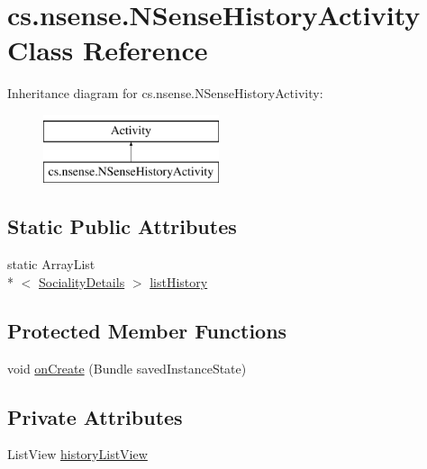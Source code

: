 \hypertarget{classcs_1_1nsense_1_1_n_sense_history_activity}{\section{cs.\-nsense.\-N\-Sense\-History\-Activity Class Reference}
\label{classcs_1_1nsense_1_1_n_sense_history_activity}
}
Inheritance diagram for cs.\-nsense.\-N\-Sense\-History\-Activity\-:\begin{figure}[H]
\begin{center}
\leavevmode
\includegraphics[height=2.000000cm]{classcs_1_1nsense_1_1_n_sense_history_activity}
\end{center}
\end{figure}
\subsection*{Static Public Attributes}
\begin{DoxyCompactItemize}
\item 
static Array\-List\\*
$<$ \hyperlink{classcs_1_1nsense_1_1inference_module_1_1_sociality_details}{Sociality\-Details} $>$ \hyperlink{classcs_1_1nsense_1_1_n_sense_history_activity_aefa56a8805849b71eff327c6586b133f}{list\-History}
\end{DoxyCompactItemize}
\subsection*{Protected Member Functions}
\begin{DoxyCompactItemize}
\item 
void \hyperlink{classcs_1_1nsense_1_1_n_sense_history_activity_ae7d13c6289c709083edf6a957c303a34}{on\-Create} (Bundle saved\-Instance\-State)
\end{DoxyCompactItemize}
\subsection*{Private Attributes}
\begin{DoxyCompactItemize}
\item 
List\-View \hyperlink{classcs_1_1nsense_1_1_n_sense_history_activity_a1611194c8ab199089bbca866bef6d908}{history\-List\-View}
\end{DoxyCompactItemize}

